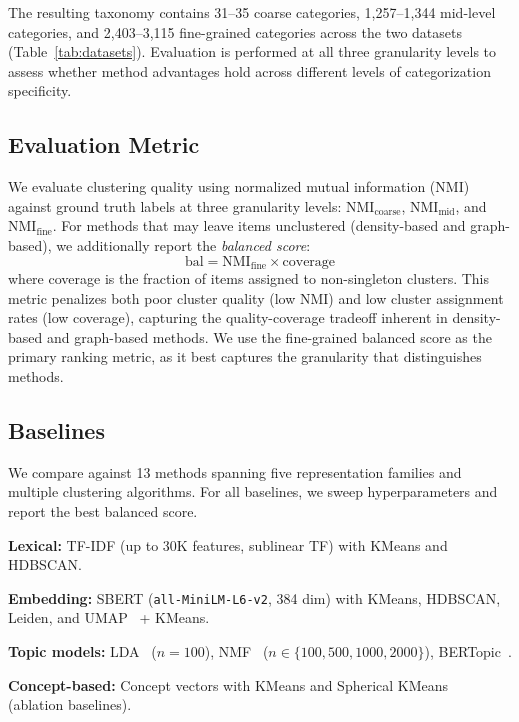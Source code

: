 \documentclass[conference]{IEEEtran}
\begin{document}
The resulting taxonomy contains 31--35 coarse categories, 1,257--1,344 mid-level categories, and 2,403--3,115 fine-grained categories across the two datasets (Table~\ref{tab:datasets}). Evaluation is performed at all three granularity levels to assess whether method advantages hold across different levels of categorization specificity.

\subsection{Evaluation Metric}

We evaluate clustering quality using normalized mutual information (NMI) against ground truth labels at three granularity levels: $\text{NMI}_{\text{coarse}}$, $\text{NMI}_{\text{mid}}$, and $\text{NMI}_{\text{fine}}$. For methods that may leave items unclustered (density-based and graph-based), we additionally report the \textit{balanced score}:
\begin{equation}
    \text{bal} = \text{NMI}_{\text{fine}} \times \text{coverage}
\end{equation}
where coverage is the fraction of items assigned to non-singleton clusters. This metric penalizes both poor cluster quality (low NMI) and low cluster assignment rates (low coverage), capturing the quality-coverage tradeoff inherent in density-based and graph-based methods. We use the fine-grained balanced score as the primary ranking metric, as it best captures the granularity that distinguishes methods.

\subsection{Baselines}

We compare against 13 methods spanning five representation families and multiple clustering algorithms. For all baselines, we sweep hyperparameters and report the best balanced score.

\textbf{Lexical:} TF-IDF (up to 30K features, sublinear TF) with KMeans and HDBSCAN.

\textbf{Embedding:} SBERT (\texttt{all-MiniLM-L6-v2}, 384 dim) with KMeans, HDBSCAN, Leiden, and UMAP~\cite{mcinnes2018umap} + KMeans.

\textbf{Topic models:} LDA~\cite{blei2003lda} ($n\!=\!100$), NMF~\cite{lee1999nmf} ($n \in \{100, 500, 1000, 2000\}$), BERTopic~\cite{grootendorst2022bertopic}.

\textbf{Concept-based:} Concept vectors with KMeans and Spherical KMeans~\cite{dhillon2001spherical} (ablation baselines).
\end{document}
